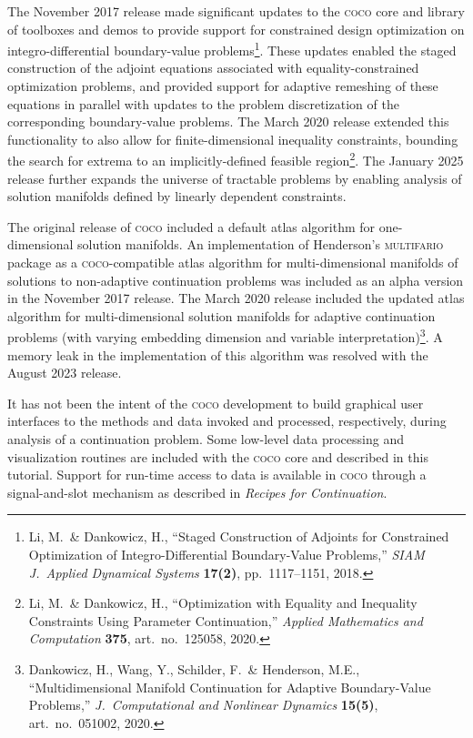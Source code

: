 The November 2017 release made significant updates to the \textsc{coco} core and library of toolboxes and demos to provide support for constrained design optimization on integro-differential boundary-value problems\footnote{Li, M.~\& Dankowicz, H., ``Staged Construction of Adjoints for Constrained Optimization of Integro-Differential Boundary-Value Problems,'' \emph{SIAM J.~Applied Dynamical Systems} \textbf{17(2)}, pp.~1117--1151, 2018.}. These updates enabled the staged construction of the adjoint equations associated with equality-constrained optimization problems, and provided support for adaptive remeshing of these equations in parallel with updates to the problem discretization of the corresponding boundary-value problems. The March 2020 release extended this functionality to also allow for finite-dimensional inequality constraints, bounding the search for extrema to an implicitly-defined feasible region\footnote{Li, M.~\& Dankowicz, H., ``Optimization with Equality and Inequality Constraints Using Parameter Continuation,'' \emph{Applied Mathematics and Computation} \textbf{375}, art.~no.~125058, 2020.}. The January 2025 release further expands the universe of tractable problems by enabling analysis of solution manifolds defined by linearly dependent constraints.

The original release of \textsc{coco} included a default atlas algorithm for one-dimensional solution manifolds. An implementation of Henderson's \textsc{multifario} package as a \textsc{coco}-compatible atlas algorithm for multi-dimensional manifolds of solutions to non-adaptive continuation problems was included as an alpha version in the November 2017 release. The March 2020 release included the updated atlas algorithm  for multi-dimensional solution manifolds for adaptive continuation problems (with varying embedding dimension and variable interpretation)\footnote{Dankowicz, H., Wang, Y., Schilder, F.~\& Henderson, M.E., ``Multidimensional Manifold Continuation for Adaptive Boundary-Value Problems,'' \emph{J.~Computational and Nonlinear Dynamics} \textbf{15(5)}, art.~no.~051002, 2020.}. A memory leak in the implementation of this algorithm was resolved with the August 2023 release.

It has not been the intent of the \textsc{coco} development to build graphical user interfaces to the methods and data invoked and processed, respectively, during analysis of a continuation problem. Some low-level data processing and visualization routines are included with the \textsc{coco} core and described in this tutorial. Support for run-time access to data is available in \textsc{coco} through a signal-and-slot mechanism as described in \emph{Recipes for Continuation}. 

